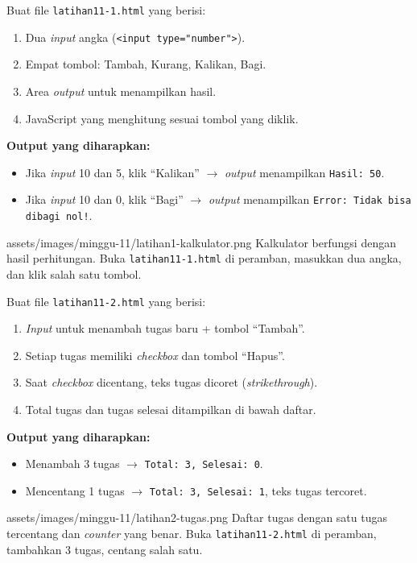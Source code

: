 \begin{latihan}
Buat file \texttt{latihan11-1.html} yang berisi:
\begin{enumerate}
  \item Dua \emph{input} angka (\texttt{<input type="number">}).
  \item Empat tombol: Tambah, Kurang, Kalikan, Bagi.
  \item Area \emph{output} untuk menampilkan hasil.
  \item JavaScript yang menghitung sesuai tombol yang diklik.
\end{enumerate}

\textbf{Output yang diharapkan:}
\begin{itemize}
  \item Jika \emph{input} 10 dan 5, klik ``Kalikan'' $\rightarrow$ \emph{output} menampilkan \texttt{Hasil: 50}.
  \item Jika \emph{input} 10 dan 0, klik ``Bagi'' $\rightarrow$ \emph{output} menampilkan \texttt{Error: Tidak bisa dibagi nol!}.
\end{itemize}

\begin{tangkapanlayar}
  {assets/images/minggu-11/latihan1-kalkulator.png}
  {Kalkulator berfungsi dengan hasil perhitungan.}
  {Buka \texttt{latihan11-1.html} di peramban, masukkan dua angka, dan klik salah satu tombol.}
\end{tangkapanlayar}
\end{latihan}

\begin{latihan}
Buat file \texttt{latihan11-2.html} yang berisi:
\begin{enumerate}
  \item \emph{Input} untuk menambah tugas baru + tombol ``Tambah''.
  \item Setiap tugas memiliki \emph{checkbox} dan tombol ``Hapus''.
  \item Saat \emph{checkbox} dicentang, teks tugas dicoret (\emph{strikethrough}).
  \item Total tugas dan tugas selesai ditampilkan di bawah daftar.
\end{enumerate}

\textbf{Output yang diharapkan:}
\begin{itemize}
  \item Menambah 3 tugas $\rightarrow$ \texttt{Total: 3, Selesai: 0}.
  \item Mencentang 1 tugas $\rightarrow$ \texttt{Total: 3, Selesai: 1}, teks tugas tercoret.
\end{itemize}

\begin{tangkapanlayar}
  {assets/images/minggu-11/latihan2-tugas.png}
  {Daftar tugas dengan satu tugas tercentang dan \emph{counter} yang benar.}
  {Buka \texttt{latihan11-2.html} di peramban, tambahkan 3 tugas, centang salah satu.}
\end{tangkapanlayar}
\end{latihan}

